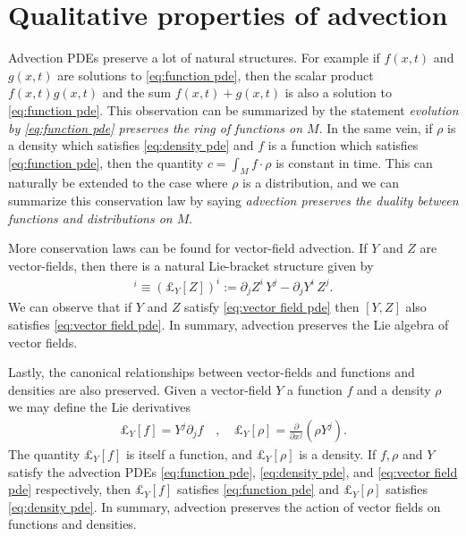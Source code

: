 \documentclass[12pt]{amsart}
\newcommand{\pder}[2]{\ensuremath{\frac{ \partial #1}{\partial #2}}}
\begin{document}
\section{Qualitative properties of advection}
\label{sec:properties}
Advection PDEs preserve a lot of natural structures.
For example if $f(x,t)$ and $g(x,t)$ are solutions to \eqref{eq:function pde}, then the scalar product $f(x,t) g(x,t)$  and the sum $f(x,t) + g(x,t)$ is also a solution to \eqref{eq:function pde}.
This observation can be summarized by the statement \emph{evolution by \eqref{eq:function pde} preserves the ring of functions on $M$}.
In the same vein, if $\rho$ is a density which satisfies \eqref{eq:density pde} and $f$ is a function which satisfies \eqref{eq:function pde}, then the quantity $c = \int_{M} f \cdot \rho$ is constant in time.
This can naturally be extended to the case where $\rho$ is a distribution, and we can summarize this conservation law by saying \emph{advection preserves the duality between functions and distributions on $M$}.

More conservation laws can be found for vector-field advection.
If $Y$ and $Z$ are vector-fields, then there is a natural Lie-bracket structure given by
\begin{align}
	[Y,Z]^{i} \equiv ( \pounds_{Y}[Z] )^{i} := \partial_{j}Z^{i} \, Y^{j} - \partial_{j}Y^{i} \, Z^{j}.
\end{align}
We can observe that if $Y$ and $Z$ satisfy \eqref{eq:vector field pde} then $[Y,Z]$ also satisfies \eqref{eq:vector field pde}.
In summary, advection preserves the Lie algebra of vector fields.

Lastly, the canonical relationships between vector-fields and functions and densities are also preserved.
Given a vector-field $Y$ a function $f$ and a density $\rho$ we may define the Lie derivatives
\begin{align}
	\pounds_{Y}[f] = Y^{j} \partial_{j}f \quad , \quad \pounds_{Y}[\rho] = \pder{}{x^{j}} ( \rho Y^{j} ).
\end{align}
The quantity $\pounds_{Y}[f]$ is itself a function, and $\pounds_{Y}[\rho]$ is a density.
If $f,\rho$ and $Y$ satisfy the advection PDEs \eqref{eq:function pde}, \eqref{eq:density pde}, and \eqref{eq:vector field pde} respectively,
then $\pounds_{Y}[f]$ satisfies \eqref{eq:function pde} and $\pounds_{Y}[\rho]$ satisfies \eqref{eq:density pde}.
In summary, advection preserves the action of vector fields on functions and densities.
\end{document}
